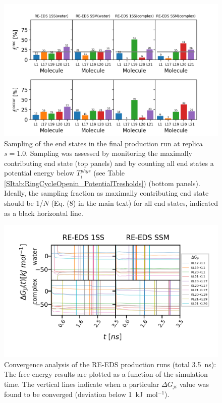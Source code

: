 \begin{figure}[H]
\centering
\includegraphics[width=\linewidth]{fig/results/ringOpening/FE/Reeds_RingOpening_production_sampling_s1.png}
\caption{Sampling of the end states in the final production run at replica $s=1.0$. Sampling was assessed by monitoring the maximally contributing end state (top panels) and by counting all end states a potential energy below $T_{i}^{phys}$ (see Table \ref{SItab:RingCycleOpenin_PotentialTresholds}) (bottom panels). Ideally, the sampling fraction as maximally contributing end state should be 1/$N$ (Eq. (8) in the main text) for all end states, indicated as a black horizontal line.}
\label{SIfig:CHK1_RingOpening_soptimization_final_Sampling_s1}
\end{figure}


\begin{figure}[H]
\centering
\includegraphics[width=\linewidth]{fig/results/ringOpening/FE/dF_RingOpening_Convergence.png}
\caption{Convergence analysis of the RE-EDS production runs (total 3.5~ns): The free-energy results are plotted as a function of the simulation time. The vertical lines indicate when a particular $\Delta G_{ji}$ value was found to be converged (deviation below 1~kJ~mol$^{-1}$).}
\label{SIfig:CHK1_RingOpening_dF_convergence}
\end{figure}
